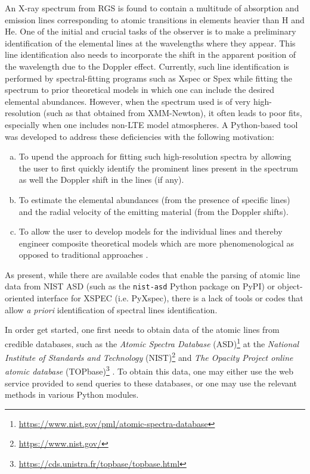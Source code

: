         An X-ray spectrum from RGS is found to contain a multitude of absorption and emission lines corresponding to atomic transitions in elements heavier than H and He. One of the initial and crucial tasks of the observer is to make a preliminary identification of the elemental lines at the wavelengths where they appear. This line identification also needs to incorporate the shift in the apparent position of the wavelength due to the Doppler effect. Currently, such line identification is performed by spectral-fitting programs such as Xspec or Spex while fitting the spectrum to prior theoretical models in which one can include the desired elemental abundances. However, when the spectrum used is of very high-resolution (such as that obtained from XMM-Newton), it often leads to poor fits, especially when one includes non-LTE model atmospheres. A Python-based tool was developed to address these deficiencies with the following motivation:
        \begin{enumerate}[a)]
            \item To upend the approach for fitting such high-resolution spectra by allowing the user to first quickly identify the prominent lines present in the spectrum as well the Doppler shift in the lines (if any).
            \item To estimate the elemental abundances (from the presence of specific lines) and the radial velocity of the emitting material (from the Doppler shifts).
            \item To allow the user to develop models for the individual lines and thereby engineer composite theoretical models which are more phenomenological as opposed to traditional approaches \cite{ness2020complications}.
        \end{enumerate}
        As present, while there are available codes that enable the parsing of atomic line data from NIST ASD (such as the \texttt{nist-asd} Python package on PyPI) or object-oriented interface for XSPEC (i.e. PyXspec), there is a lack of tools or codes that allow \textit{a priori} identification of spectral lines identification.
        
        In order get started, one first needs to obtain data of the atomic lines from credible databases, such as the \textit{Atomic Spectra Database} (ASD)\footnote{\url{https://www.nist.gov/pml/atomic-spectra-database}} at the \textit{National Institute of Standards and Technology} (NIST)\footnote{\url{https://www.nist.gov/}} \cite{ralchenko2008nist} and \textit{The Opacity Project online atomic database} (TOPbase)\footnote{\url{https://cds.unistra.fr/topbase/topbase.html}} \cite{cunto1993topbase}. To obtain this data, one may either use the web service provided to send queries to these databases, or one may use the relevant methods in various Python modules.
        

